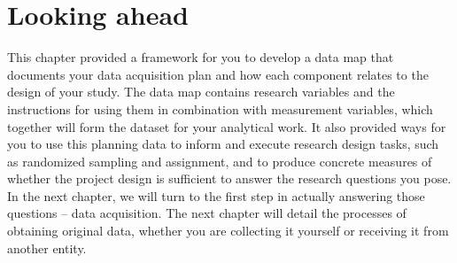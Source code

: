 \section{Looking ahead}
This chapter provided a framework for you to
develop a data map that documents your data acquisition plan and
how each component relates to the design of your study.
The data map contains research variables and the instructions
for using them in combination with measurement variables, which together
will form the dataset for your analytical work.
It also provided ways for you to use this planning data
to inform and execute research design tasks,
such as randomized sampling and assignment,
and to produce concrete measures
of whether the project design is sufficient to answer the research questions you pose.
In the next chapter,
we will turn to the first step in actually answering those questions --
data acquisition.
The next chapter will detail the processes of obtaining
original data,
whether you are collecting it yourself or
receiving it from another entity.
